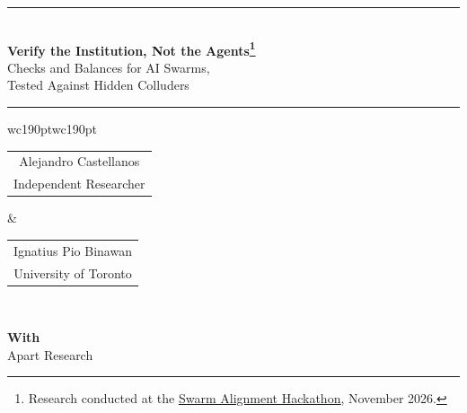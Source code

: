 \documentclass[11pt, letterpaper]{article}
\makeatletter
\newcommand{\weblink}[2]{\href{#1}{\uline{#2}}}
\newcommand{\authorcell}[2]{\begin{tabular}[t]{@{}c@{}}#1\\[-1pt]{\small\color{subheadgray}#2}\end{tabular}}
\makeatother
\begin{document}

\thispagestyle{empty}

\begin{center}
  \rule{\textwidth}{3pt}\\[16pt]
  {\fontsize{20}{25}\selectfont\bfseries
    Verify the Institution, Not the Agents\footnote{Research conducted at the
      \weblink{https://apartresearch.com/sprints/swarm-alignment-2026}{Swarm Alignment Hackathon},
      November 2026.}\\[8pt]}
  {\fontsize{13}{17}\selectfont\color{headinggray}
    Checks and Balances for AI Swarms,\\
    Tested Against Hidden Colluders\\[14pt]}
  \rule{\textwidth}{1pt}
\end{center}

\vspace{6pt}
\begin{center}
  \begin{tabular}{wc{190pt}wc{190pt}}
    \authorcell{Alejandro Castellanos}{Independent Researcher} &
    \authorcell{Ignatius Pio Binawan}{University of Toronto} \\
  \end{tabular}

  \vspace{4pt}
  \textbf{With}\\
  Apart Research
\end{center}
\end{document}
